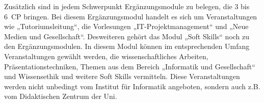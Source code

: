 Zusätzlich sind in jedem Schwerpunkt Ergänzungsmodule zu belegen, die 3 bis 6~CP bringen. Bei diesem Ergänzungsmodul handelt es sich um Veranstaltungen wie „Tutoriumsleitung“, die Vorlesungen „IT-Projektmanagement“ und „Neue Medien und Gesellschaft“. Desweiteren gehört das Modul „Soft Skills“ noch zu den Ergänzungsmodulen. In diesem Modul können im entsprechenden Umfang Veranstaltungen gewählt werden, die wissenschaftliches Arbeiten, Präsentationstechniken, Themen aus dem Bereich „Informatik und Gesellschaft“ und Wissensethik und weitere Soft Skills vermitteln. Diese Veranstaltungen werden nicht unbedingt vom Institut für Informatik angeboten, sondern auch z.B. vom Didaktischen Zentrum der Uni. 

